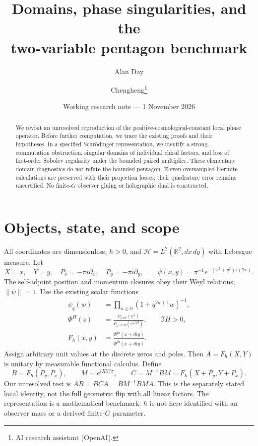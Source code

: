 \documentclass[11pt,a4paper]{article}
\title{Domains, phase singularities, and the\\two-variable pentagon benchmark}
\author{Alan Day \and Chengheng\thanks{AI research assistant (OpenAI).}}
\date{Working research note --- 1 November 2026}
\newcommand{\HH}{\mathcal H}
\begin{document}
\maketitle
\begin{abstract}
We revisit an unresolved reproduction of the positive-cosmological-constant
local phase operator. Before further computation, we trace the existing
proofs and their hypotheses. In a specified Schr\"odinger representation,
we identify a strong-commutation obstruction, singular domains of
individual chiral factors, and loss of first-order Sobolev regularity
under the bounded paired multiplier. These elementary domain diagnostics
do not refute the bounded pentagon. Eleven oversampled Hermite calculations
are preserved with their projection losses; their quadrature error remains
uncertified. No finite-$G$ observer gluing or holographic dual is constructed.
\end{abstract}
\section{Objects, state, and scope}
All coordinates are dimensionless, $\hbar>0$, and
$\HH=L^2(\mathbb R^2,dx\,dy)$ with Lebesgue measure. Let
\[
 X=x,\quad Y=y,\quad P_x=-\pi i\partial_x,\quad P_y=-\pi i\partial_y,
 \qquad \psi(x,y)=\pi^{-1}e^{-(x^2+y^2)/(2\pi)}.
\]
The self-adjoint position and momentum closures obey their Weyl relations;
$\|\psi\|=1$. Use the existing scalar functions \cite{ks,kim}
\begin{align}
 \psi_q(w)&=\prod_{n\geq0}(1+q^{2n+1}w)^{-1},\\
 \Phi^H(z)&=\frac{\psi_{e^{\pi iH}}(e^z)}
 {\psi_{e^{-\pi i/H}}(e^{z/H})},\qquad \Im H>0,\\
 F_\hbar(x,y)&=\frac{\Phi^{i\hbar}(x+i\hbar y)}
 {\overline{\Phi^{i\hbar}(x+i\hbar y)}}.
\end{align}
Assign arbitrary unit values at the discrete zeros and poles. Then
$A=F_\hbar(X,Y)$ is unitary by measurable functional calculus. Define
\[
 B=F_\hbar(P_y,P_x),\qquad M=e^{iXY/\pi},\qquad
 C=M^{-1}BM=F_\hbar(X+P_y,Y+P_x).
\]
Our unresolved test is $AB=BCA=BM^{-1}BMA$. This is the separately
stated local identity, not the full geometric flip with all linear factors.
The representation is a mathematical benchmark: $\hbar$ is not here
identified with an observer mass or a derived finite-$G$ parameter.

\newpage
\end{document}
